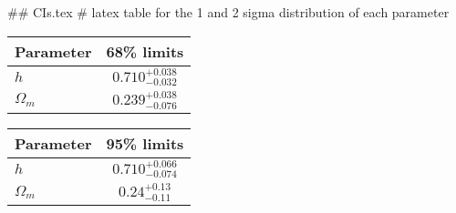 ## CIs.tex
# latex table for the 1 and 2 sigma distribution of each parameter

\begin{tabular} { l  c}
 Parameter &  68\% limits\\
\hline
{\boldmath$h              $} & $0.710^{+0.038}_{-0.032}   $\\
{\boldmath$\Omega_m       $} & $0.239^{+0.038}_{-0.076}   $\\
\hline
\end{tabular}

\begin{tabular} { l  c}
 Parameter &  95\% limits\\
\hline
{\boldmath$h              $} & $0.710^{+0.066}_{-0.074}   $\\
{\boldmath$\Omega_m       $} & $0.24^{+0.13}_{-0.11}      $\\
\hline
\end{tabular}
